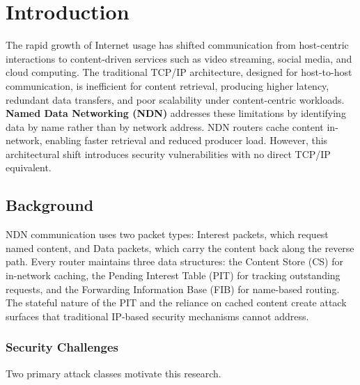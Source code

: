 \documentclass[12pt]{report}
\begin{document}

\chapter{Introduction}

The rapid growth of Internet usage has shifted communication from host-centric interactions to content-driven services such as video streaming, social media, and cloud computing. The traditional TCP/IP architecture, designed for host-to-host communication, is inefficient for content retrieval, producing higher latency, redundant data transfers, and poor scalability under content-centric workloads. \textbf{Named Data Networking (NDN)} addresses these limitations by identifying data by name rather than by network address. NDN routers cache content in-network, enabling faster retrieval and reduced producer load. However, this architectural shift introduces security vulnerabilities with no direct TCP/IP equivalent.

\section{Background}

NDN communication uses two packet types: Interest packets, which request named content, and Data packets, which carry the content back along the reverse path. Every router maintains three data structures: the Content Store (CS) for in-network caching, the Pending Interest Table (PIT) for tracking outstanding requests, and the Forwarding Information Base (FIB) for name-based routing. The stateful nature of the PIT and the reliance on cached content create attack surfaces that traditional IP-based security mechanisms cannot address.

\subsection{Security Challenges}

Two primary attack classes motivate this research.
\end{document}
